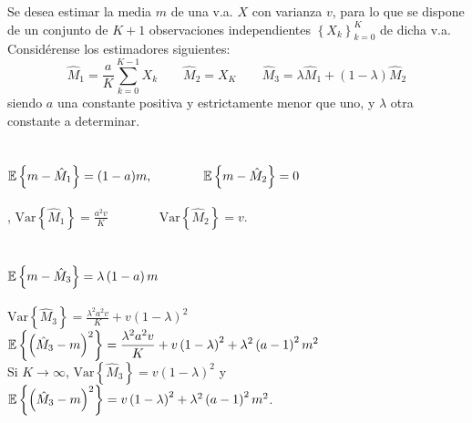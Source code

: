 \ifspanish

\question Se desea estimar la media $m$ de una v.a. $X$ con varianza $v$, para lo que se dispone de un conjunto de $K+1$ observaciones independientes $\left\{ X_k \right\}_{k=0}^{K} $  de dicha v.a. Considérense los estimadores siguientes:
$$ \hat{M}_1 = \frac{a}{K} \sum_{k=0}^{K-1} {X_k}  \quad  \quad  \hat{M}_2=X_K  \quad\quad  
   \hat{M}_3 = \lambda \hat{M}_1 + \left( 1- \lambda\right) \hat{M}_2 $$ 		 		 
siendo $a$ una constante positiva y estrictamente menor que uno, y $\lambda$  otra constante a determinar.

 
\begin{solution}
\begin{parts}
\part {$\mathbb{E}\left\{m - \hat{M}_1 \right\} = (1-a) m, \qquad \qquad
       \mathbb{E}\left\{m - \hat{M}_2 \right\} = 0$}, \newline
      $\text{Var}\left\{ \hat{M}_1 \right\} = \displaystyle\frac{a^2v}{K} \qquad \qquad
       \text{Var}\left\{ \hat{M}_2 \right\} = v$.
\part {$\mathbb{E}\left\{m - \hat{M}_3 \right\} = \lambda \left(1-a\right) m$} \hspace{1cm}
      $\text{Var}\left\{ \hat{M}_3 \right\} = \displaystyle\frac{\lambda^2 a^2v}{K}+v\left( 1-\lambda\right)^2 $\\
      $\mathbb{E}\left\{\left( \hat{M}_3 - m \right)^2 \right\} = \displaystyle\frac{\lambda^2 a^2v}{K}+v\left( 1-\lambda\right)^2 +  \lambda^2 \left(a-1 \right)^2 m^2$ \\

Si $K\rightarrow \infty$, $\text{Var} \left\{ \hat{M}_3 \right\} = v\left( 1-\lambda\right)^2 $ y 
$\mathbb{E}\left\{ \left( \hat{M}_3 - m \right)^2 \right\} = v\left( 1-\lambda\right)^2 +   \lambda^2 \left(a-1 \right)^2 m^2$.
\end{parts}
\end{solution}

